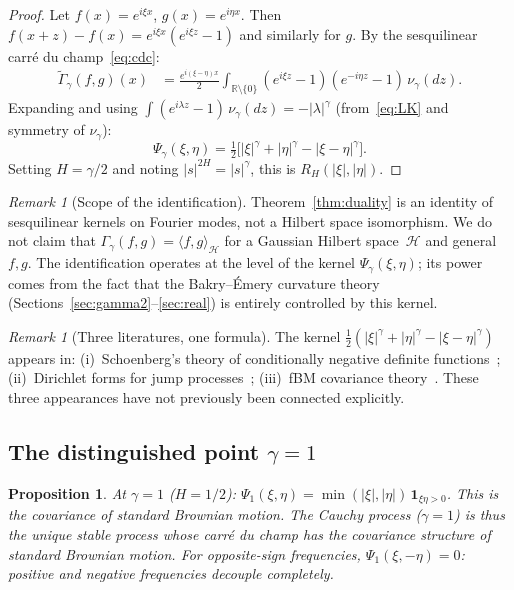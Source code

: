 \documentclass[11pt,a4paper]{article}
\theoremstyle{plain}
\newtheorem{proposition}[theorem]{Proposition}
\theoremstyle{definition}
\theoremstyle{remark}
\newtheorem{remark}[theorem]{Remark}
\newcommand{\R}{\mathbb{R}}
\begin{document}
\begin{proof}
Let $f(x) = e^{i\xi x}$, $g(x) = e^{i\eta x}$.
Then $f(x+z) - f(x) = e^{i\xi x}(e^{i\xi z} - 1)$ and similarly
for $g$. By the sesquilinear carr\'e du champ~\eqref{eq:cdc}:
\begin{align*}
  \widetilde\Gamma_\gamma(f,g)(x)
  &= \frac{e^{i(\xi-\eta)x}}{2}\int_{\R \setminus \{0\}}
     (e^{i\xi z} - 1)(e^{-i\eta z} - 1)\,\nu_\gamma(dz).
\end{align*}
Expanding and using $\int (e^{i\lambda z} - 1)\,\nu_\gamma(dz)
= -|\lambda|^\gamma$ (from~\eqref{eq:LK} and symmetry of $\nu_\gamma$):
\[
  \Psi_\gamma(\xi,\eta)
  = \tfrac{1}{2}\bigl[|\xi|^\gamma + |\eta|^\gamma
  - |\xi - \eta|^\gamma\bigr].
\]
Setting $H = \gamma/2$ and noting $|s|^{2H} = |s|^\gamma$,
this is $R_H(|\xi|, |\eta|)$.
\end{proof}

\begin{remark}[Scope of the identification]\label{rem:scope}
Theorem~\ref{thm:duality} is an identity of sesquilinear kernels
on Fourier modes, not a Hilbert space isomorphism. We do not claim
that $\Gamma_\gamma(f,g) = \langle f,g \rangle_{\mathcal{H}}$ for
a Gaussian Hilbert space~$\mathcal{H}$ and general $f,g$.
The identification operates at the level of the kernel
$\Psi_\gamma(\xi,\eta)$; its power comes from the fact that the
Bakry--\'Emery curvature theory (Sections~\ref{sec:gamma2}--\ref{sec:real})
is entirely controlled by this kernel.
\end{remark}

\begin{remark}[Three literatures, one formula]\label{rem:three}
The kernel $\frac{1}{2}(|\xi|^\gamma + |\eta|^\gamma
- |\xi-\eta|^\gamma)$ appears in:
(i)~Schoenberg's theory of conditionally negative definite
functions~\cite{Schoenberg1938};
(ii)~Dirichlet forms for jump
processes~\cite{BoettcherSchillingWang2013};
(iii)~fBM covariance theory~\cite{Mishura2008}.
These three appearances have not previously been connected explicitly.
\end{remark}


\subsection{The distinguished point $\gamma = 1$}

\begin{proposition}\label{prop:self-dual}
At $\gamma = 1$ ($H = 1/2$):
$\Psi_1(\xi,\eta)
= \min(|\xi|, |\eta|)\,\mathbf{1}_{\xi\eta > 0}$.
This is the covariance of standard Brownian motion.
The Cauchy process ($\gamma = 1$) is thus the unique stable process
whose carr\'e du champ has the covariance structure of standard
Brownian motion.
For opposite-sign frequencies, $\Psi_1(\xi,-\eta) = 0$:
positive and negative frequencies decouple completely.
\end{proposition}
\end{document}
